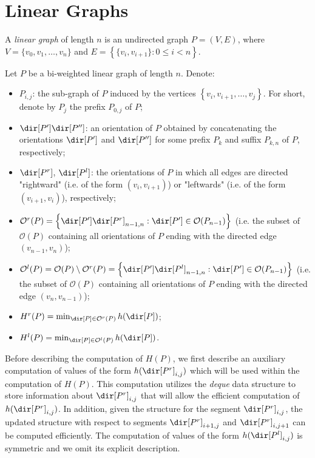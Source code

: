 
\section{Linear Graphs}

A \emph{linear graph} of length $n$ is an undirected graph $P = (V, E)$, where $V = \{v_0, v_1, \ldots, v_n\}$ and $E = \left\{\{v_i, v_{i+1}\} : 0\leq i < n\right\}$. 


Let $P$ be a bi-weighted linear graph of length $n$. Denote:
\begin{itemize}
	\item $P_{i, j}$: the sub-graph of $P$ induced by the vertices $\left\{v_i, v_{i+1}, \ldots, v_j \right\}$. For short, denote by $P_j$ the prefix $P_{0, j}$ of $P$;
	\item $\dir[P'] \dir[P'']$: an orientation of $P$ obtained by concatenating the orientations $\dir[P']$ and $\dir[P'']$ for some prefix $P_{k}$ and suffix $P_{k, n}$ of $P$, respectively;
	\item $\dir[P^r]$, $\dir[P^l]$: the orientations of $P$ in which all edges are directed "rightward" (i.e. of the form $(v_i, v_{i+1})$) or "leftwards" (i.e. of the form $(v_{i+1}, v_i)$), respectively;
	\item $\mathcal{O}^r(P) = \left\{\dir[P'] \dir[P^r]_{n-1,n} : \dir[P'] \in \mathcal{O}(P_{n-1})\right\}$ (i.e. the subset of $\mathcal{O}(P)$ containing all orientations of $P$ ending with the directed edge $(v_{n-1}, v_n)$);
	\item $\mathcal{O}^l(P) = \mathcal{O}(P) \setminus \mathcal{O}^r(P) = \left\{\dir[P'] \dir[P^l]_{n-1,n} : \dir[P'] \in \mathcal{O}(P_{n-1})\right\}$ (i.e. the subset of $\mathcal{O}(P)$ containing all orientations of $P$ ending with the directed edge $(v_n, v_{n-1})$);
	\item $H^r(P) = \min_{\dir[P] \in \mathcal{O}^r(P)} h(\dir[P])$;
	\item $H^l(P) = \min_{\dir[P] \in \mathcal{O}^l(P)} h(\dir[P])$.
\end{itemize}

Before describing the computation of $H(P)$, we first describe an auxiliary computation of values of the form $h(\dir[P^r]_{i, j})$ which will be used within the computation of $H(P)$. This computation utilizes the \emph{deque} data structure to store information about $\dir[P^r]_{i, j}$ that will allow the efficient computation of $h(\dir[P^r]_{i, j})$. In addition, given the structure for the segment $\dir[P^r]_{i, j}$, the updated structure with respect to segments $\dir[P^r]_{i+1, j}$ and $\dir[P^r]_{i, j+1}$ can be computed efficiently. The computation of values of the form $h(\dir[P^l]_{i, j})$ is symmetric and we omit its explicit description. 

